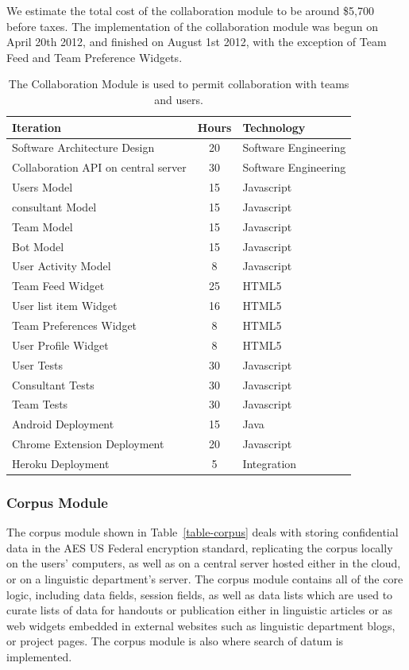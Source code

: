 \documentclass[12pt]{article}
\begin{document}
We estimate the total cost of the collaboration module to be around \$5,700 before taxes. The implementation of the collaboration module was begun on April 20th 2012, and finished on August 1st 2012, with the exception of Team Feed and Team Preference Widgets. 
\begin{table}[h]
\begin{center}
  \begin{tabular}{ | lcl | }
\hline
Iteration&  Hours&  Technology  \\
\hline
Software Architecture Design& 20& Software Engineering  \\ 
Collaboration API on central server&  30& Software Engineering\\ 
Users Model&  15& Javascript  \\ 
consultant Model& 15& Javascript  \\ 
Team Model& 15& Javascript  \\ 
Bot Model&  15& Javascript  \\ 
User Activity Model&  8&  Javascript  \\ 
Team Feed Widget& 25& HTML5 \\ 
User list item Widget&  16& HTML5 \\ 
Team Preferences Widget&  8&  HTML5 \\ 
User Profile Widget&  8&  HTML5 \\ 
User Tests& 30& Javascript \\ 
Consultant Tests& 30& Javascript  \\ 
Team Tests& 30& Javascript  \\ 
Android Deployment& 15& Java  \\ 
Chrome Extension Deployment&  20& Javascript \\ 
Heroku Deployment&  5&  Integration \\ 
\hline
  \end{tabular}
  \caption{The Collaboration Module is used to permit collaboration with teams and users. }
\label{table-collaboration}
  \end{center}
\end{table}


\newpage
\subsubsection{Corpus Module}
The corpus module shown in Table~\ref{table-corpus} deals with storing confidential data in the AES US Federal encryption standard, replicating the corpus locally on the  users' computers, as well as on a central server hosted either in the cloud, or on a linguistic department's server. The corpus module contains all of the core logic, including data fields, session fields, as well as data lists which are used to curate lists of data for handouts or publication either in linguistic articles or as web widgets embedded in external websites such as linguistic department blogs, or project pages. The corpus module is also where search of datum is implemented. 
\end{document}
